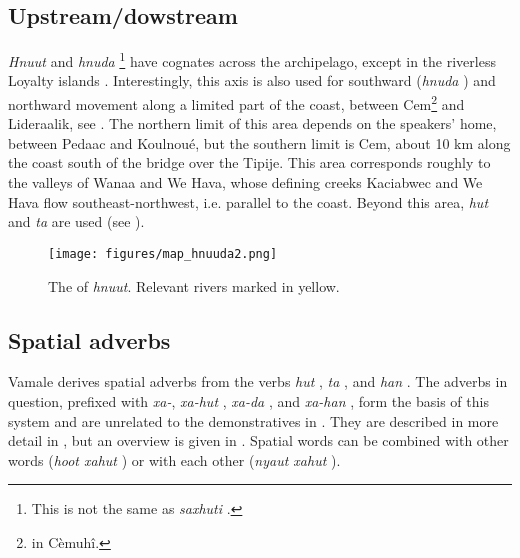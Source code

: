 \subsection{Upstream/dowstream}

\textit{Hnuut}  and \textit{hnuda} \footnote{This is not the same as \textit{saxhuti} .} have cognates across the archipelago, except in the riverless Loyalty islands \parencite[232]{bearune_lexpression_2012}.
Interestingly, this axis is also used for southward (\textit{hnuda} ) and northward movement along a limited part of the coast, between {Cem}\footnote{ in Cèmuhî.} and {Lideraalik}, see . The northern limit of this area depends on the speakers' home, between {Pedaac} and {Koulnoué}, but the southern limit is {Cem}, about 10 km along the coast south of the bridge over the {Tipije}. This area corresponds roughly to the valleys of Wanaa and We Hava, whose defining creeks Kaciabwec and We Hava flow southeast-northwest, i.e. parallel to the coast. Beyond this area, \textit{hut}  and \textit{ta}  are used (see ). 

\begin{figure}
	\texttt{[image: figures/map\_hnuuda2.png]}
	\caption{The  of \textit{hnuut}. Relevant rivers marked in yellow.}
	\label{fig:map_hnuuda}
\end{figure}

\subsection{Spatial adverbs}
\label{ssec:spat_adv}
Vamale derives spatial adverbs from the verbs \textit{hut} , \textit{ta} , and \textit{han} . The adverbs in question, prefixed with \textit{xa-}, \textit{xa-hut} , \textit{xa-da} , and \textit{xa-han} , form the basis of this system and are unrelated to the demonstratives in . They are described in more detail in , but an overview is given in . 
Spatial words can be combined with other words (\textit{hoot xahut} ) or with each other (\textit{nyaut xahut} ).

